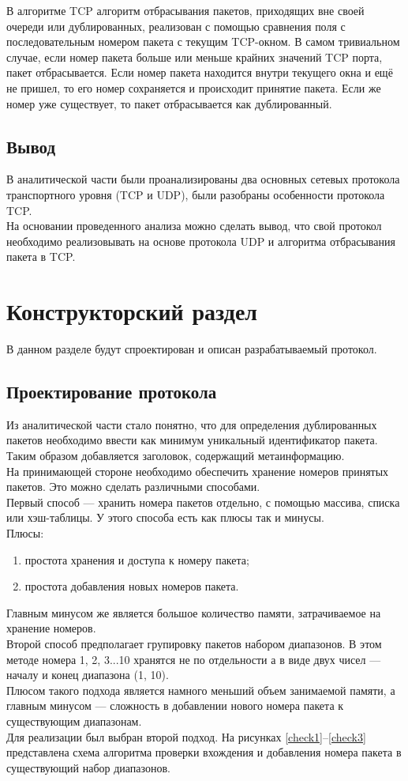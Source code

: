 \documentclass[14pt, a4paper]{extarticle}
\begin{document}
В алгоритме TCP алгоритм отбрасывания пакетов, приходящих вне своей очереди или дублированных, реализован с помощью сравнения поля с последовательным номером пакета с текущим TCP-окном. В самом тривиальном случае, если номер пакета больше или меньше крайних значений TCP порта, пакет отбрасывается. Если номер пакета находится внутри текущего окна и ещё не пришел, то его номер сохраняется и происходит принятие пакета. Если же номер уже существует, то пакет отбрасывается как дублированный.

\subsection{Вывод}
В аналитической части были проанализированы два основных сетевых протокола транспортного уровня (TCP и UDP), были разобраны особенности протокола TCP. \\
\indent На основании проведенного анализа можно сделать вывод, что свой протокол необходимо реализовывать на основе протокола UDP и алгоритма отбрасывания пакета в TCP.

\clearpage
\section{Конструкторский раздел}
В данном разделе будут спроектирован и описан разрабатываемый протокол.
\subsection{Проектирование протокола}
Из аналитической части стало понятно, что для определения дублированных пакетов необходимо ввести как минимум уникальный идентификатор пакета. Таким образом добавляется заголовок, содержащий метаинформацию. \\
\indent На принимающей стороне необходимо обеспечить хранение номеров принятых пакетов. Это можно сделать различными способами. \\
\indent Первый способ --- хранить номера пакетов отдельно, с помощью массива, списка или хэш-таблицы. У этого способа есть как плюсы так и минусы. \\
\indent Плюсы:
\begin{enumerate}
	\item простота хранения и доступа к номеру пакета;
	\item простота добавления новых номеров пакета.
\end{enumerate}
\indent Главным минусом же является большое количество памяти, затрачиваемое на хранение номеров. \\
\indent Второй способ предполагает групировку пакетов набором диапазонов. В этом методе номера 1, 2, 3...10 хранятся не по отдельности а в виде двух чисел --- началу и конец диапазона (1, 10). \\
\indent Плюсом такого подхода является намного меньший объем занимаемой памяти, а главным минусом --- сложность в добавлении нового номера пакета к существующим диапазонам. \\
\indent Для реализации был выбран второй подход. На рисунках \ref{check1}--\ref{check3} представлена схема алгоритма проверки вхождения и добавления номера пакета в существующий набор диапазонов.
\end{document}
